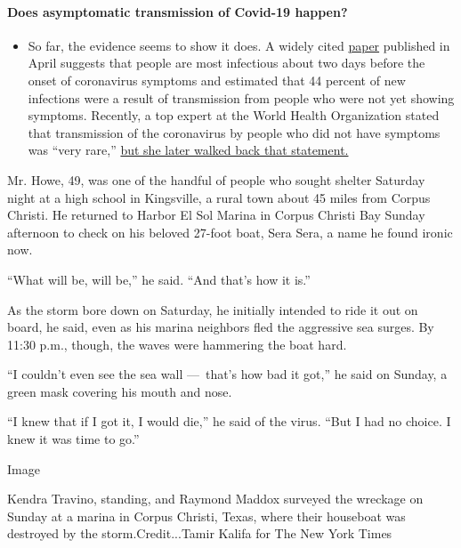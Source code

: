 \begin{itemize}
{  \paragraph{Does asymptomatic transmission of Covid-19
  happen?}\label{does-asymptomatic-transmission-of-covid-19-happen}}

  \begin{itemize}
  \tightlist
  \item
    So far, the evidence seems to show it does. A widely cited
    \href{https://www.nature.com/articles/s41591-020-0869-5}{paper}
    published in April suggests that people are most infectious about
    two days before the onset of coronavirus symptoms and estimated that
    44 percent of new infections were a result of transmission from
    people who were not yet showing symptoms. Recently, a top expert at
    the World Health Organization stated that transmission of the
    coronavirus by people who did not have symptoms was ``very rare,''
    \href{https://www.nytimes.com/2020/06/09/world/coronavirus-updates.html?action=click\&pgtype=Article\&state=default\&region=MAIN_CONTENT_3\&context=storylines_faq\#link-1f302e21}{but
    she later walked back that statement.}
  \end{itemize}
\end{itemize}

Mr. Howe, 49, was one of the handful of people who sought shelter
Saturday night at a high school in Kingsville, a rural town about 45
miles from Corpus Christi. He returned to Harbor El Sol Marina in Corpus
Christi Bay Sunday afternoon to check on his beloved 27-foot boat, Sera
Sera, a name he found ironic now.

``What will be, will be,'' he said. ``And that's how it is.''

As the storm bore down on Saturday, he initially intended to ride it out
on board, he said, even as his marina neighbors fled the aggressive sea
surges. By 11:30 p.m., though, the waves were hammering the boat hard.

``I couldn't even see the sea wall ---~that's how bad it got,'' he said
on Sunday, a green mask covering his mouth and nose.

``I knew that if I got it, I would die,'' he said of the virus. ``But I
had no choice. I knew it was time to go.''

Image

Kendra Travino, standing, and Raymond Maddox surveyed the wreckage on
Sunday at a marina in Corpus Christi, Texas, where their houseboat was
destroyed by the storm.Credit...Tamir Kalifa for The New York Times

